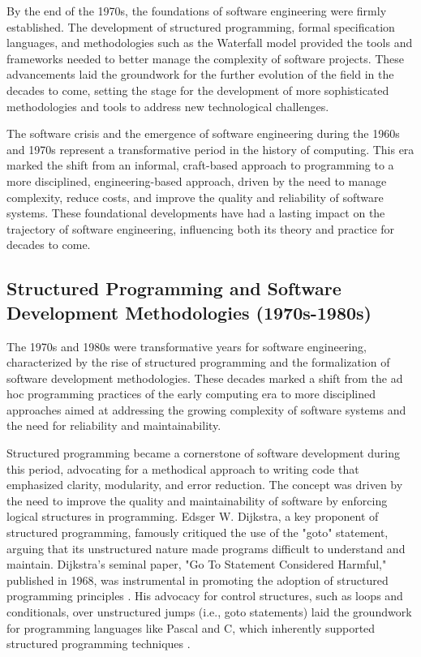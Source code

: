 \begin{refsection}
By the end of the 1970s, the foundations of software engineering were firmly established. The development of structured programming, formal specification languages, and methodologies such as the Waterfall model provided the tools and frameworks needed to better manage the complexity of software projects. These advancements laid the groundwork for the further evolution of the field in the decades to come, setting the stage for the development of more sophisticated methodologies and tools to address new technological challenges.

The software crisis and the emergence of software engineering during the 1960s and 1970s represent a transformative period in the history of computing. This era marked the shift from an informal, craft-based approach to programming to a more disciplined, engineering-based approach, driven by the need to manage complexity, reduce costs, and improve the quality and reliability of software systems. These foundational developments have had a lasting impact on the trajectory of software engineering, influencing both its theory and practice for decades to come.

\subsection{Structured Programming and Software Development Methodologies (1970s-1980s)}

The 1970s and 1980s were transformative years for software engineering, characterized by the rise of structured programming and the formalization of software development methodologies. These decades marked a shift from the ad hoc programming practices of the early computing era to more disciplined approaches aimed at addressing the growing complexity of software systems and the need for reliability and maintainability.

Structured programming became a cornerstone of software development during this period, advocating for a methodical approach to writing code that emphasized clarity, modularity, and error reduction. The concept was driven by the need to improve the quality and maintainability of software by enforcing logical structures in programming. Edsger W. Dijkstra, a key proponent of structured programming, famously critiqued the use of the "goto" statement, arguing that its unstructured nature made programs difficult to understand and maintain. Dijkstra's seminal paper, "Go To Statement Considered Harmful," published in 1968, was instrumental in promoting the adoption of structured programming principles \cite[pp.~147-148]{dijkstra1968goto}. His advocacy for control structures, such as loops and conditionals, over unstructured jumps (i.e., goto statements) laid the groundwork for programming languages like Pascal and C, which inherently supported structured programming techniques \cite[pp.~223-226]{sebesta2007concepts}.


\end{refsection}
